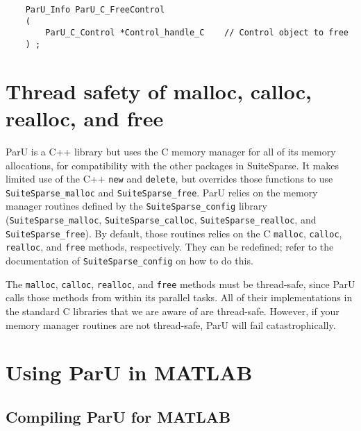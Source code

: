 \documentclass[12pt]{article}
\begin{document}
    {\footnotesize
    \begin{verbatim}
    ParU_Info ParU_C_FreeControl
    (
        ParU_C_Control *Control_handle_C    // Control object to free
    ) ; \end{verbatim} }

\section{Thread safety of {\sf malloc}, {\sf calloc}, {\sf realloc}, and
{\sf free}}

ParU is a C++ library but uses the C memory manager for all of its memory
allocations, for compatibility with the other packages in SuiteSparse.  It
makes limited use of the C++ \verb'new' and \verb'delete', but overrides those
functions to use \verb'SuiteSparse_malloc' and \verb'SuiteSparse_free'.  ParU
relies on the memory manager routines defined by the \verb'SuiteSparse_config'
library (\verb'SuiteSparse_malloc', \verb'SuiteSparse_calloc',
\verb'SuiteSparse_realloc', and \verb'SuiteSparse_free').  By default, those
routines relies on the C \verb'malloc', \verb'calloc', \verb'realloc', and
\verb'free' methods, respectively.  They can be redefined; refer to the
documentation of \verb'SuiteSparse_config' on how to do this.

The \verb'malloc', \verb'calloc', \verb'realloc', and \verb'free' methods must
be thread-safe, since ParU calls those methods from within its parallel tasks.
All of their implementations in the standard C libraries that we are aware of
are thread-safe.  However, if your memory manager routines are not thread-safe,
ParU will fail catastrophically.

\section{Using ParU in MATLAB}

\subsection{Compiling ParU for MATLAB}
\end{document}
